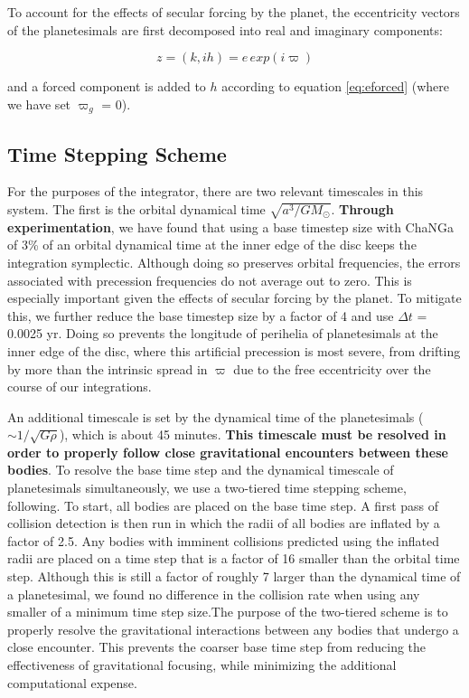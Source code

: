 \documentclass[fleqn,usenatbib]{mnras}
\begin{document}
To account for the effects of secular forcing by the planet, the eccentricity vectors of the planetesimals are first decomposed into real and imaginary 
components:

\begin{equation}\label{eq:kh}
	z = (k, ih) = e \, exp(i \varpi)
\end{equation}

\noindent and a forced component is added to $h$ according to equation \ref{eq:eforced} (where we have set $\varpi_{g}$ = 0).

\subsection{Time Stepping Scheme}\label{sec:timestep}

For the purposes of the integrator, there are two relevant timescales in this system. The first is the orbital dynamical time $\sqrt{a^3/
G M_{\odot}}$. \textbf{Through experimentation}, we have found that using a base timestep size with {\sc ChaNGa} of 3\% of an orbital dynamical time
at the inner edge of the disc keeps the integration symplectic. Although doing so preserves orbital frequencies, the errors associated with
precession frequencies do not average out to zero. This is especially important given the effects of secular forcing by the planet. To mitigate
this, we further reduce the base timestep size by a factor of 4 and use $\Delta t$ = 0.0025 yr. Doing so prevents the longitude of perihelia of
planetesimals at the inner edge of the disc, where this artificial precession is most severe, from drifting by more than the intrinsic spread in $\varpi$ due to the
free eccentricity over the course of our integrations.

An additional timescale is set by the dynamical time of the planetesimals ($\sim 1/\sqrt{G \rho}$), which is about 45 minutes. \textbf{This timescale must be resolved in order to properly 
follow close gravitational encounters between these bodies}. To resolve the base time step and the dynamical timescale of planetesimals simultaneously, we use a two-tiered time 
stepping scheme, following\citep{2015ApJ...806...23L}. To start, all bodies are placed on the base time step. A first pass of collision detection is then run in which the radii of all bodies are 
inflated by a factor of 2.5. Any bodies with imminent collisions predicted using the inflated radii are placed on a time step that is a factor of 16 smaller than the orbital time step. Although 
this is still a factor of roughly 7 larger than the dynamical time of a planetesimal, we found no difference in the collision rate when using any smaller of a minimum time step size.The 
purpose of the two-tiered scheme is to properly resolve the gravitational interactions between any bodies that undergo a close encounter. This prevents the coarser base time step from 
reducing the effectiveness of gravitational focusing, while minimizing the additional computational expense.
\end{document}
